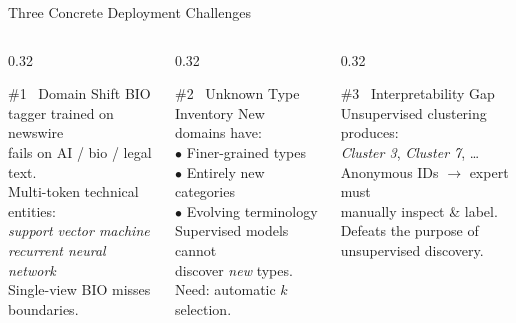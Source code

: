 \documentclass[aspectratio=169,10pt]{beamer}
\begin{document}
\begin{frame}{Three Concrete Deployment Challenges}
  \begin{columns}[T]
    \begin{column}{0.32\textwidth}
      \begin{block}{\#1 \ Domain Shift}
        BIO tagger trained on newswire\\fails on AI / bio / legal text.\\[4pt]
        Multi-token technical entities:\\
        \emph{support vector machine}\\
        \emph{recurrent neural network}\\[4pt]
        Single-view BIO misses boundaries.
      \end{block}
    \end{column}
    \begin{column}{0.32\textwidth}
      \begin{block}{\#2 \ Unknown Type Inventory}
        New domains have:\\
        $\bullet$ Finer-grained types\\
        $\bullet$ Entirely new categories\\
        $\bullet$ Evolving terminology\\[4pt]
        Supervised models cannot\\discover \emph{new} types.\\
        Need: automatic $k$ selection.
      \end{block}
    \end{column}
    \begin{column}{0.32\textwidth}
      \begin{block}{\#3 \ Interpretability Gap}
        Unsupervised clustering produces:\\[4pt]
        \quad \emph{Cluster 3}, \emph{Cluster 7}, \ldots\\[4pt]
        Anonymous IDs $\to$ expert must\\
        manually inspect \& label.\\[4pt]
        Defeats the purpose of\\unsupervised discovery.
      \end{block}
    \end{column}
  \end{columns}

\end{frame}
\end{document}
